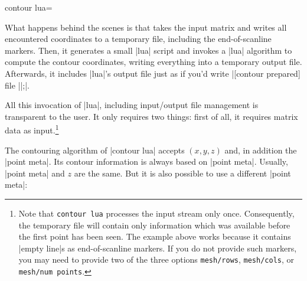 {{\begin{plottype}[/pgfplots]{
    contour lua=\textcolor{black}{}%
}
\begin{codeexample}[]
\end{codeexample}
    \noindent What happens behind the scenes is that \PGFPlots{} takes the
    input matrix and writes all encountered coordinates to a temporary file,
    including the end-of-scanline markers. Then, it generates a small |lua|
    script and invokes a |lua| algorithm to compute the contour coordinates, writing
    everything into a temporary output file. Afterwards, it includes
    |lua|'s output file just as if you'd write
    |[contour prepared] file ||;|.

    All this invocation of |lua|, including input/output file management is
    transparent to the user. It only requires two things: first of all, it
    requires matrix data as input.\footnote{Note that \texttt{contour lua}
    processes the input stream only once. Consequently, the temporary file will
    contain only information which was available before the first point has
    been seen. The example above works because it contains |empty line|s as
    end-of-scanline markers. If you do not provide such markers, you may need
    to provide two of the three options \texttt{mesh/rows}, \texttt{mesh/cols},
    or \texttt{mesh/num points}.}

    The contouring algorithm of |contour lua| accepts $(x,y,z)$ and, in addition the |point meta|. Its contour information is always based on |point meta|. Usually, |point meta| and $z$ are the same. But it is also possible to use a different |point meta|:

\begin{codeexample}[]
\end{codeexample}


\end{plottype}}}
